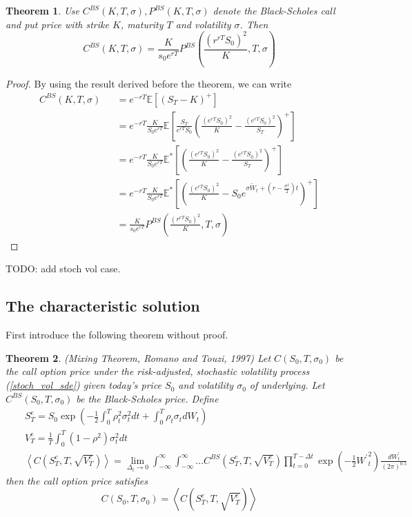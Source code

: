 \documentclass[10pt]{article}
\theoremstyle{plain}
\newtheorem{theorem}{Theorem}[section]
\numberwithin{equation}{section}
\numberwithin{table}{section}
\newcommand{\s}{\sigma}
\newcommand{\prt}[1]{\left( #1 \right)}  %
\newcommand{\E}{\mathbb{E}}
\begin{document}
\begin{theorem}
    Use $C^{BS}(K,T,\s), P^{BS}(K,T,\s)$ denote the Black-Scholes call and put price with strike $K$, maturity $T$ and volatility $\s$. Then 
    \[
        C^{BS}(K,T,\s) = \frac{K}{s_0e^{rT}}P^{BS}\prt{\frac{(r^{rT}S_0)^2}{K},T,\s}    
    \]
\end{theorem}
\begin{proof}

    By using the result derived before the theorem, we can write 
    \begin{eqnarray*}
        C^{BS}(K, T, \s) &&= e^{-rT} \E[(S_T-K)^+] \\
        &&= e^{-rT} \frac{K}{S_0 e^{rT}} \E \left[ \frac{S_T}{e^{rT}S_0} \prt{\frac{(e^{rT} S_0)^2}{K} - \frac{(e^{rT} S_0)^2}{S_T} }^+ \right] \\
        &&= e^{-rT} \frac{K}{S_0 e^{rT}} \E^* \left[\prt{\frac{(e^{rT} S_0)^2}{K} - \frac{(e^{rT} S_0)^2}{S_T} }^+  \right] \\
        &&= e^{-rT} \frac{K}{S_0 e^{rT}} \E^* \left[\prt{\frac{(e^{rT} S_0)^2}{K} - S_0  e^{\s \tilde{W}_t +(r-\frac{\s^2}{2})t} }^+  \right] \\
        &&=\frac{K}{s_0e^{rT}}P^{BS}\prt{\frac{(r^{rT}S_0)^2}{K},T,\s}  
    \end{eqnarray*}
\end{proof}


TODO: add stoch vol case.

\subsection{The characteristic solution}
First introduce the following theorem without proof.

\begin{theorem}(Mixing Theorem, Romano and Touzi, 1997)
    Let $C(S_0,T, \s_0) $ be the call option price under
    the risk-adjusted, stochastic volatility process (\ref{stoch_vol_sde}) given today's price $S_0$ and volatility $\s_0$ of underlying. 
    Let $C^{BS}(S_0, T, \s_0)$ be the Black-Scholes price. Define 
    \begin{eqnarray*}
        && S^e_T=S_0\exp \prt{-\frac{1}{2}\int^T_0 \rho_t^2 \s_t^2 dt + \int^T_0 \rho_t  \s_t d W_t } \\
        && V^e_T=\frac{1}{T} \int_0^T (1-\rho^2) \s_t^2 dt \\
        && \left< C(S_T^e, T, \sqrt{V_T^e}) \right> = \lim_{\Delta_t \rightarrow 0} \int^{\infty}_{-\infty} \int^{\infty}_{-\infty}...C^{BS}(S_T^e, T, \sqrt{V_T^e}) \prod_{t=0}^{T-\Delta t} \exp(-\frac{1}{2} {W^{'}}^2_t )
        \frac{d W^{'}_t}{(2\pi)^{0.5}}
    \end{eqnarray*}
    then the call option price satisfies
    \[
        C(S_0,T, \s_0) = \left< C(S_T^e, T, \sqrt{V_T^e}) \right>
    \]

\end{theorem}
\end{document}

